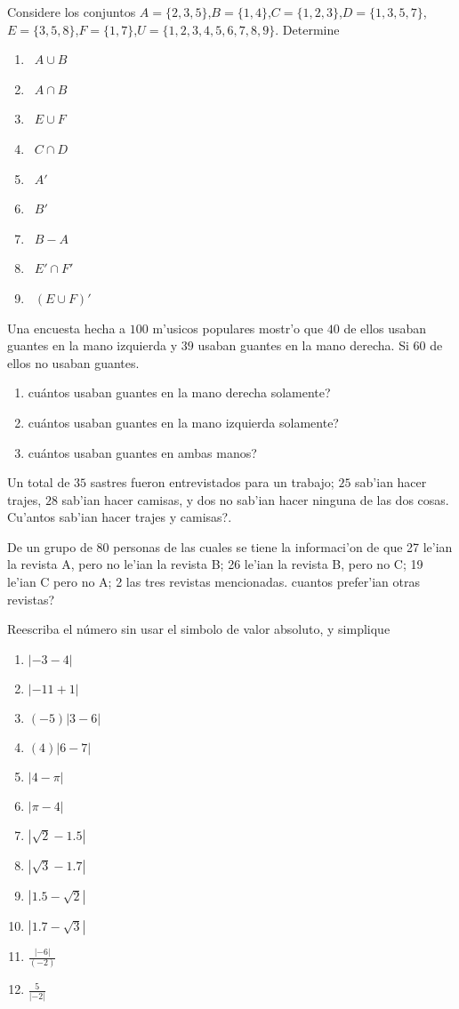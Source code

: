 \documentclass[]{book}
\theoremstyle{definition}
\theoremstyle{definition}
\theoremstyle{definition}
\theoremstyle{remark}
\begin{document}
Considere los conjuntos \(A=\{2,3,5\}\),\(B=\{1,4\}\),\(C=\{1,2,3\}\),\(D=\{1,3,5,7\}\),\(E=\{3,5,8\}\),\(F=\{1,7\}\),\(U=\{1,2,3,4,5,6,7,8,9\}\). Determine

\begin{enumerate}
	\item \ $A\cup B$
	\item \ $A\cap B$
	\item \ $E\cup F$
	\item \ $C\cap D$
	\item \ $A'$
	\item \ $B'$
	\item \ $B-A$
	\item \ $E'\cap F'$
	\item \ $(E\cup F)'$
\end{enumerate}

Una encuesta hecha a \(100\) m'usicos populares mostr'o que \(40\) de ellos usaban guantes en la mano izquierda y \(39\) usaban guantes en la mano derecha. Si \(60\) de ellos no usaban guantes.

\begin{enumerate}
    \item  cu\'antos usaban guantes en la mano derecha solamente?
    \item  cu\'antos usaban guantes en la mano izquierda solamente?
    \item  cu\'antos usaban guantes en ambas manos?
\end{enumerate}

Un total de \(35\) sastres fueron entrevistados para un trabajo; \(25\) sab'ian hacer trajes, \(28\) sab'ian hacer camisas, y dos no sab'ian hacer ninguna de las dos cosas. Cu'antos sab'ian hacer trajes y camisas?.

De un grupo de 80 personas de las cuales se tiene la informaci'on de que 27 le'ian la revista A, pero no le'ian la revista B; 26 le'ian la revista B, pero no C; 19 le'ian C pero no A; 2 las tres revistas mencionadas. cuantos prefer'ian otras revistas?

Reescriba el número sin usar el simbolo de valor absoluto, y simplique

\begin{enumerate}
	\item $\left| -3-4 \right|$
	\item $\left| -11+1 \right|$
	\item $(-5)\left| 3-6 \right|$
	\item $(4)\left| 6-7 \right|$
	\item $\left| 4-\pi \right|$
	\item $\left| \pi-4 \right|$
	\item $\left| \sqrt{2}-1.5 \right|$
	\item $\left| \sqrt{3}-1.7 \right|$
	\item $\left| 1.5-\sqrt{2}\right|$
	\item $\left| 1.7-\sqrt{3}\right|$
	\item $\frac{\left|-6\right|}{(-2)}$
	\item $\frac{5}{\left|-2\right|}$
\end{enumerate}
\end{document}

